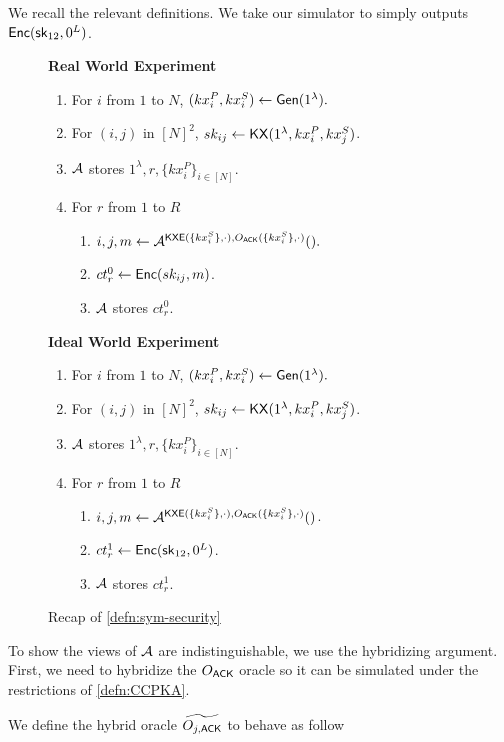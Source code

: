We recall the relevant definitions. We take our simulator to simply outputs $\mathsf{Enc}({\mathsf{sk}}_{12}, 0^{L})$.
\begin{figure}[h!]
\begin{framed}
\textbf{Real World Experiment}
\begin{enumerate}
    \item For $i$ from $1$ to $N$, $(kx_i^P, kx_i^S) \leftarrow \mathsf{Gen}(1^{\lambda}).$
    \item For $(i, j)$ in $[N]^2$, $sk_{ij} \leftarrow \mathsf{KX}(1^{\lambda}, kx_i^P, kx_j^S)$.
    \item $\mathcal{A}$ stores $1^{\lambda}, r, \{kx_i^P\}_{i \in [N]}$.
    \item For $r$ from $1$ to $R$
    \begin{enumerate}
        \item $i, j, m \leftarrow \mathcal{A}^{\mathsf{KXE}(\{kx_i^S\}, \cdot), O_{\mathsf{ACK}}(\{kx_i^S\}, \cdot)}().$
        \item $ct^{0}_r \leftarrow \mathsf{Enc}(sk_{ij}, m)$.
        \item $\mathcal{A}$ stores $ct^{0}_r$.
    \end{enumerate}
\end{enumerate}
\textbf{Ideal World Experiment}
\begin{enumerate}
    \item For $i$ from $1$ to $N$, $(kx_i^P, kx_i^S) \leftarrow \mathsf{Gen}(1^{\lambda}).$
    \item For $(i, j)$ in $[N]^2$, $sk_{ij} \leftarrow \mathsf{KX}(1^{\lambda}, kx_i^P, kx_j^S)$.
    \item $\mathcal{A}$ stores $1^{\lambda}, r, \{kx_i^P\}_{i \in [N]}$.
    \item For $r$ from $1$ to $R$
    \begin{enumerate}
        \item $i, j, m \leftarrow \mathcal{A}^{\mathsf{KXE}(\{kx_i^S\}, \cdot), O_{\mathsf{ACK}}(\{kx_i^S\}, \cdot)}()$.
        \item $ct^1_r \leftarrow \mathsf{Enc}({\mathsf{sk}}_{12}, 0^{L})$.
        \item $\mathcal{A}$ stores $ct^{1}_r$.
    \end{enumerate}
\end{enumerate}
\end{framed}
\caption{Recap of \cref{defn:sym-security}}
\end{figure}
To show the views of $\mathcal{A}$ are indistinguishable, we use the hybridizing argument. First, we need to hybridize the $O_{\mathsf{ACK}}$ oracle so it can be simulated under the restrictions of \cref{defn:CCPKA}. 
\begin{definition}
    We define the hybrid oracle $\widetilde{O_{j, \mathsf{ACK}}}$ to behave as follow
\end{definition}


